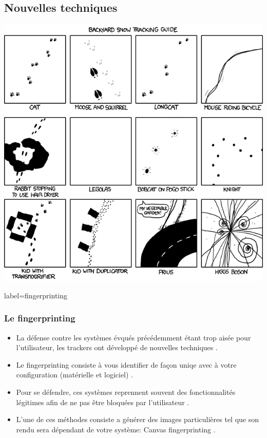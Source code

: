 \documentclass{beamer}
\begin{document}
    \subsection{Nouvelles techniques}
        \begin{frame}
            \begin{center}
                \includegraphics[scale=0.35]{img/snow_tracking.png}
            \end{center}
        \end{frame}
        \begin{frame}{label=fingerprinting}
            \frametitle{Le fingerprinting}
            \begin{center}
                \begin{itemize}
                    \item La défense contre les systèmes évqués précédemment étant trop aisée pour l'utilisateur, les trackers ont développé de nouvelles techniques \cite{web}.
                    \item Le fingerprinting consiste à vous identifier de façon uniqe avec à votre configuration (matérielle et logiciel) \cite{unique}.
                    \item Pour se défendre, ces systèmes reprennent souvent des fonctionnalités légitimes afin de ne pas être bloquées par l'utilisateur \cite{canvas}.
                    \item L'une de ces méthodes consiste a générer des images particulières tel que son rendu sera dépendant de votre système: Canvas fingerprinting \cite{canvas}.
                \end{itemize}
            \end{center}
        \end{frame}
\end{document}
